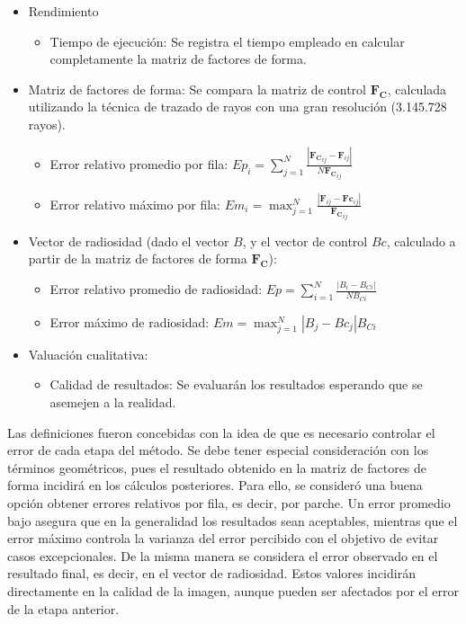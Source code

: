 \begin{itemize}
	\item Rendimiento
		\begin{itemize}
			\item Tiempo de ejecución: Se registra el tiempo empleado en calcular completamente la matriz de factores de forma.
		\end{itemize}
	\item Matriz de factores de forma: Se compara la matriz de control $\mathbf{F_{C}}$, calculada utilizando la técnica de trazado de rayos con una gran resolución (3.145.728 rayos).
		\begin{itemize}
			\item Error relativo promedio por fila: $Ep_{i} = \sum_{j=1}^{N} \frac{|\mathbf{F_{C}}_{ij} -\mathbf{F}_{ij}|}{N \mathbf{F_{C}}_{ij}}$
			\item Error relativo máximo por fila: $Em_{i} = \max_{j=1}^{N}\frac{|\mathbf{F}_{ij} -\mathbf{Fc}_{ij}|}{\mathbf{F_{C}}_{ij}}$
		\end{itemize}
	\item Vector de radiosidad (dado el vector $B$, y el vector de control $Bc$, calculado a partir de la matriz de factores de forma $\mathbf{F_{C}}$):
	\begin{itemize}
		\item Error relativo promedio de radiosidad: $Ep = \sum_{i=1}^{N} \frac{|B_{i}-B_{Ci}|}{N B_{Ci}}$
		\item Error máximo de radiosidad: $Em = \max_{j=1}^{N}|{B_{j} - Bc_{j}}|{B_{Ci}}$
	\end{itemize}
\item Valuación cualitativa:
	\begin{itemize}
		\item Calidad de resultados: Se evaluarán los resultados esperando que se asemejen a la realidad.
	\end{itemize}
\end{itemize}

Las definiciones fueron concebidas con la idea de que es necesario controlar el error de cada etapa del método. Se debe tener especial consideración con los términos geométricos, pues el resultado obtenido en la matriz de factores de forma incidirá en los cálculos posteriores. Para ello, se consideró una buena opción obtener errores relativos por fila, es decir, por parche. Un error promedio bajo asegura que en la generalidad los resultados sean aceptables, mientras que el error máximo controla la varianza del error percibido con el objetivo de evitar casos excepcionales. De la misma manera se considera el error observado en el resultado final, es decir, en el vector de radiosidad. Estos valores incidirán directamente en la calidad de la imagen, aunque pueden ser afectados por el error de la etapa anterior.

